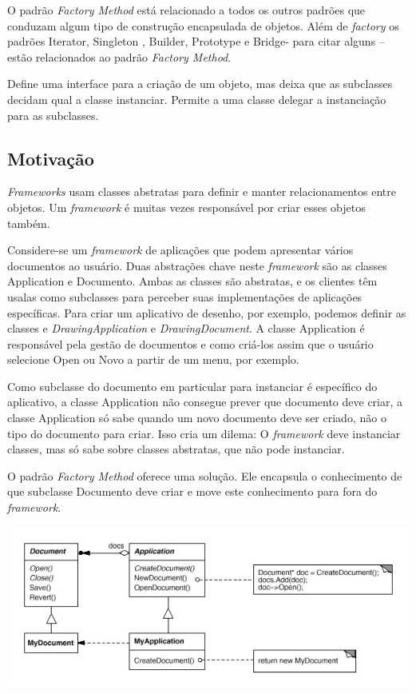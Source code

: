 O padrão \emph{Factory Method} está relacionado a todos os outros padrões que conduzam
algum tipo de construção encapsulada de objetos. Além de \emph{factory} os padrões Iterator,
Singleton , Builder, Prototype e Bridge- para citar alguns – estão relacionados ao padrão
\emph{Factory Method}.

Define uma interface para a criação de um objeto, mas deixa que as subclasses
decidam qual a classe instanciar. Permite a uma classe delegar a instanciação para as
subclasses.\cite{gamma95}


\subsection{Motivação}
\label{sub:fac_motiv}

\emph{Frameworks} usam classes abstratas para definir e manter relacionamentos entre
objetos. Um \emph{framework} é muitas vezes responsável por criar esses objetos também.

Considere-se um \emph{framework} de aplicações que podem apresentar vários documentos ao
usuário. Duas abstrações chave neste \emph{framework} são as classes Application e
Documento. Ambas as classes são abstratas, e os clientes têm usalas como subclasses para perceber
suas implementações de aplicações específicas. Para criar um aplicativo de desenho, por
exemplo, podemos definir as classes e \emph{DrawingApplication} e \emph{DrawingDocument}. A
classe Application é responsável pela gestão de documentos e como criá-los assim que o usuário selecione Open ou Novo a partir de um menu, por exemplo.\cite{gamma95}

Como subclasse do documento em particular para instanciar é específico do aplicativo,
a classe Application não consegue prever que documento deve criar, a classe Application só sabe quando um novo documento deve ser criado, não o tipo do documento para criar. Isso cria um dilema: O \emph{framework} deve instanciar classes, mas só sabe sobre classes abstratas, que não pode instanciar.\cite{gamma95}

O padrão \emph{Factory Method} oferece uma solução. Ele encapsula o conhecimento de
que subclasse Documento deve criar e move este conhecimento para fora do \emph{framework}.\cite{gamma95}

\begin{center}
	\includegraphics[scale=0.40]{Figuras/image1.jpg}
	\label{fig:diagrama1}
\end{center}

